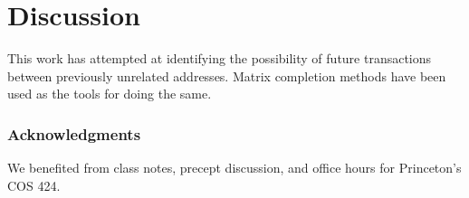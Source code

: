 \documentclass{article} %
\begin{document}
\section{Discussion}

This work has attempted at identifying the possibility of future transactions between previously unrelated addresses. Matrix completion methods have been used as the tools for doing the same.

\subsubsection*{Acknowledgments}

We benefited from class notes, precept discussion, and office hours for Princeton's COS 424.



\end{document}
